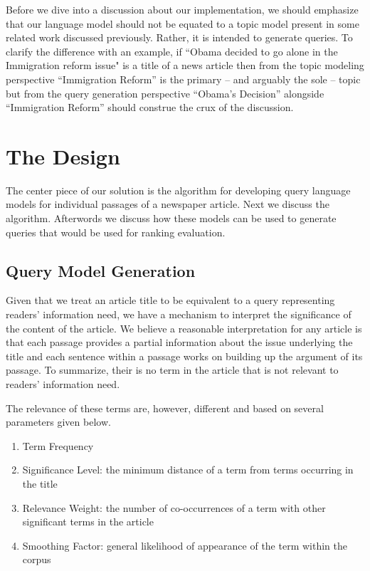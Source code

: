 \documentclass[article]{IEEEtran}
\begin{document}
Before we dive into a discussion about our implementation, we should emphasize that our language model should not be equated to a topic model present in some related work discussed previously. Rather, it is intended to generate queries. To clarify the difference with an example, if ``Obama decided to go alone in the Immigration reform issue" is a title of a news article then from the topic modeling perspective ``Immigration Reform'' is the primary -- and arguably the sole -- topic but from the query generation perspective ``Obama's Decision'' alongside ``Immigration Reform'' should construe the crux of the discussion.    

\section{The Design}
\label{des}
The center piece of our solution is the algorithm for developing query language models for individual passages of a newspaper article. Next we discuss the algorithm. Afterwords we discuss how these models can be used to generate queries that would be used for ranking evaluation.   

\subsection{Query Model Generation}
Given that we treat an article title to be equivalent to a query representing readers' information need, we have a mechanism to interpret the significance of the content of the article. We believe a reasonable interpretation for any article is that each passage provides a partial information about the issue underlying the title and each sentence within a passage works on building up the argument of its passage. To summarize, their is no term in the article that is not relevant to readers' information need.     

The relevance of these terms are, however, different and based on several parameters given below. 

\begin{enumerate}
\item Term Frequency
\item Significance Level: the minimum distance of a term from terms occurring in the title
\item Relevance Weight: the number of co-occurrences of a term with other significant terms in the article 
\item Smoothing Factor: general likelihood of appearance of the term within the corpus      
\end{enumerate}
\end{document}
